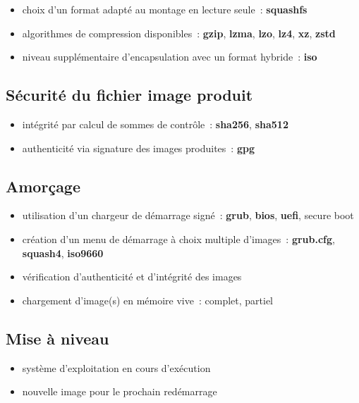 \documentclass[10pt]{article}
\newenvironment{itmz}{\begin{itemize}
\setlength{\itemsep}{0em}
}{\end{itemize}}
\begin{document}
\begin{itmz}
\item{choix d’un format adapté au montage en lecture seule : \textbf{squashfs}}
\item{algorithmes de compression disponibles : \textbf{gzip}, \textbf{lzma}, \textbf{lzo}, \textbf{lz4}, \textbf{xz}, \textbf{zstd}}
\item{niveau supplémentaire d’encapsulation avec un format hybride : \textbf{iso}}
\end{itmz}

\subsection{Sécurité du fichier image produit}

\begin{itmz}
\item{intégrité par calcul de sommes de contrôle : \textbf{sha256}, \textbf{sha512}}
\item{authenticité via signature des images produites : \textbf{gpg}}
\end{itmz}

\subsection{Amorçage}

\begin{itmz}
\item{utilisation d’un chargeur de démarrage signé : \textbf{grub}, \textbf{bios}, \textbf{uefi}, secure boot}
\item{création d’un menu de démarrage à choix multiple d’images : \textbf{grub.cfg}, \textbf{squash4}, \textbf{iso9660}}
\item{vérification d’authenticité et d’intégrité des images}
\item{chargement d’image(s) en mémoire vive : complet, partiel}
\end{itmz}

\subsection{Mise à niveau}

\begin{itmz}
\item{système d’exploitation en cours d’exécution}
\item{nouvelle image pour le prochain redémarrage}
\end{itmz}
\end{document}
